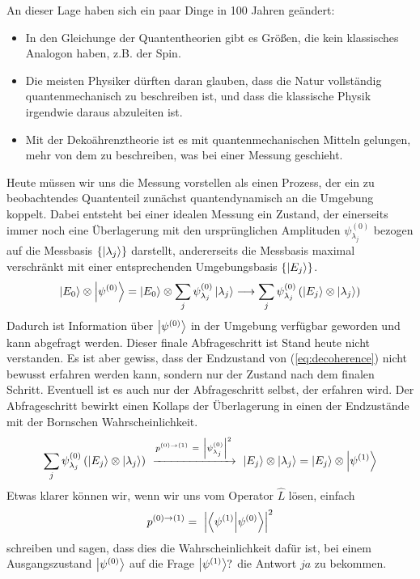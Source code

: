 \documentclass[12pt]{article}
\begin{document}
An dieser Lage haben sich ein paar Dinge in 100 Jahren geändert:
\begin{itemize}
\item In den Gleichunge der Quantentheorien gibt es Größen, die kein klassisches Analogon haben, z.B. der Spin. 
\item Die meisten Physiker dürften daran glauben, dass die Natur vollständig quantenmechanisch zu beschreiben ist, und dass die klassische Physik irgendwie daraus abzuleiten ist.
\item Mit der Dekoährenztheorie ist es mit quantenmechanischen Mitteln gelungen, mehr von dem zu beschreiben, was bei einer Messung geschieht.
\end{itemize}

Heute müssen wir uns die Messung vorstellen als einen Prozess, der ein zu beobachtendes Quantenteil zunächst quantendynamisch an die Umgebung koppelt. 
Dabei entsteht bei einer idealen Messung ein Zustand, der einerseits immer noch eine Überlagerung mit den ursprünglichen Amplituden $\psi^{(0)}_{\lambda_j}$ bezogen auf die Messbasis $\{\ket{\lambda_j}\}$ darstellt, andererseits die Messbasis maximal verschränkt mit einer entsprechenden Umgebungsbasis $\{\ket{E_j}\}$. 
\begin{equation}
\label{eq:decoherence}
\ket{E_0}\otimes\ket{\psi^{(0)}} = \ket{E_0}\otimes\sum_j \psi^{(0)}_{\lambda_j} \ket{\lambda_j}
\longrightarrow \sum_j \psi^{(0)}_{\lambda_j} \left( \ket{E_j} \otimes \ket{\lambda_j} \right)
\end{equation}
Dadurch ist Information über $\ket{\psi^{(0)}}$ in der Umgebung verfügbar geworden und kann abgefragt werden. Dieser finale Abfrageschritt ist Stand heute nicht verstanden. Es ist aber gewiss, dass der Endzustand von (\ref{eq:decoherence}) nicht bewusst erfahren werden kann, sondern nur der Zustand nach dem finalen Schritt. Eventuell ist es auch nur der Abfrageschritt selbst, der erfahren wird. Der Abfrageschritt bewirkt einen Kollaps der Überlagerung in einen der Endzustände mit der Bornschen Wahrscheinlichkeit.
\begin{equation} 
\label{eq:collapse}
\sum_j \psi^{(0)}_{\lambda_j} \left( \ket{E_j} \otimes \ket{\lambda_j} \right)
\ \xrightarrow{p^{(0)\rightarrow(1)}\ =\ \left|\psi^{(0)}_{\lambda_j}\right|^2}\ 
\ket{E_j} \otimes \ket{\lambda_j} = \ket{E_j} \otimes \ket{\psi^{(1)}}
\end{equation}
Etwas klarer können wir, wenn wir uns vom Operator $\hat{L}$ lösen, einfach
\begin{equation} 
p^{(0)\rightarrow(1)} =\ \Bigl| \bra{\psi^{(1)}}\ket{\psi^{(0)}} \Bigr| ^2
\end{equation}
schreiben und sagen, dass dies die Wahrscheinlichkeit dafür ist, bei einem Ausgangszustand $\ket{\psi^{(0)}}$ auf die Frage $\ket{\psi^{(1)}}?$ die Antwort $ja$ zu bekommen.
\end{document}

